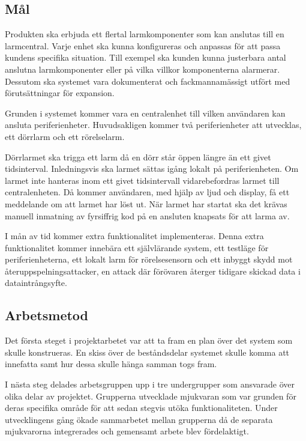 \documentclass[a4paper]{article}
\begin{document}
\subsection{Mål}

Produkten ska erbjuda ett flertal larmkomponenter som kan anslutas till en larmcentral.
Varje enhet ska kunna konfigureras och anpassas för att passa kundens specifika situation.
Till exempel ska kunden kunna justerbara antal anslutna larmkomponenter eller på vilka villkor komponenterna alarmerar.
Dessutom ska systemet vara dokumenterat och fackmannamässigt utfört med förutsättningar för expansion.

Grunden i systemet kommer vara en centralenhet till vilken användaren kan ansluta periferienheter.
Huvudsakligen kommer två periferienheter att utvecklas, ett dörrlarm och ett rörelselarm.

Dörrlarmet ska trigga ett larm då en dörr står öppen längre än ett givet tidsinterval.
Inledningsvis ska larmet sättas igång lokalt på periferienheten.
Om larmet inte hanteras inom ett givet tidsintervall vidarebefordras larmet till centralenheten.
Då kommer användaren, med hjälp av ljud och display, få ett meddelande om att larmet har löst ut.
När larmet har startat ska det krävas manuell inmatning av fyrsiffrig kod på en ansluten knapsats för att larma av.

I mån av tid kommer extra funktionalitet implementeras.
Denna extra funktionalitet kommer innebära ett självlärande system, ett testläge för periferienheterna, ett lokalt larm för rörelsesensorn och ett inbyggt skydd mot återuppspelningsattacker, en attack där förövaren återger tidigare skickad data i dataintrångsyfte.


\subsection{Arbetsmetod}

Det första steget i projektarbetet var att ta fram en plan över det system som skulle konstrueras.
En skiss över de beståndsdelar systemet skulle komma att innefatta samt hur dessa skulle hänga samman togs fram.

I nästa steg delades arbetsgruppen upp i tre undergrupper som ansvarade över olika delar av projektet.
Grupperna utvecklade mjukvaran som var grunden för deras specifika område för att sedan stegvis utöka funktionaliteten.
Under utvecklingens gång ökade sammarbetet mellan grupperna då de separata mjukvarorna integrerades och gemensamt arbete blev fördelaktigt.
\end{document}
